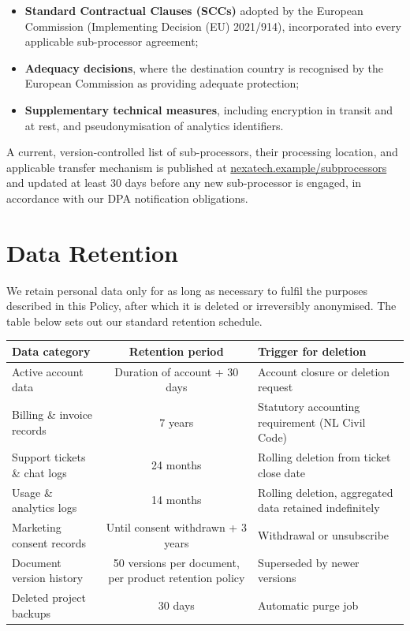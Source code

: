 \documentclass[11pt,a4paper]{scrartcl}
\begin{document}
\begin{sloppypar}
\begin{itemize}
  \item \textbf{Standard Contractual Clauses (SCCs)} adopted by the European Commission
        (Implementing Decision (EU) 2021/914), incorporated into every applicable
        sub-processor agreement;
  \item \textbf{Adequacy decisions}, where the destination country is recognised by the
        European Commission as providing adequate protection;
  \item \textbf{Supplementary technical measures}, including encryption in transit and at
        rest, and pseudonymisation of analytics identifiers.
\end{itemize}
\end{sloppypar}

A current, version-controlled list of sub-processors, their processing location, and applicable
transfer mechanism is published at \url{nexatech.example/subprocessors} and updated at least
30 days before any new sub-processor is engaged, in accordance with our DPA notification
obligations.

\section{Data Retention}

We retain personal data only for as long as necessary to fulfil the purposes described in this
Policy, after which it is deleted or irreversibly anonymised. The table below sets out our
standard retention schedule.

\begin{tabularx}{\linewidth}{@{}Y c Y@{}}
\toprule
\textbf{Data category} & \textbf{Retention period} & \textbf{Trigger for deletion} \\
\midrule
Active account data & Duration of account + 30 days & Account closure or deletion request \\
Billing \& invoice records & 7 years & Statutory accounting requirement (NL Civil Code) \\
Support tickets \& chat logs & 24 months & Rolling deletion from ticket close date \\
Usage \& analytics logs & 14 months & Rolling deletion, aggregated data retained indefinitely \\
Marketing consent records & Until consent withdrawn + 3 years & Withdrawal or unsubscribe \\
Document version history & 50 versions per document, per product retention policy & Superseded
  by newer versions \\
Deleted project backups & 30 days & Automatic purge job \\
\bottomrule
\end{tabularx}
\end{document}
